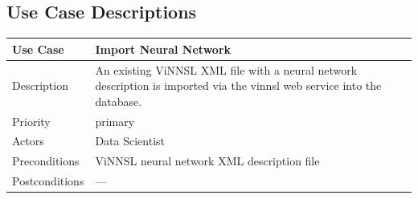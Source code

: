 \subsection{Use Case Descriptions}\label{use-case-descriptions}

\begin{longtable}[]{@{}ll@{}}
\toprule
\begin{minipage}[b]{0.27\columnwidth}\raggedright\strut
\textbf{Use Case}\strut
\end{minipage} & \begin{minipage}[b]{0.68\columnwidth}\raggedright\strut
\textbf{Import Neural Network}\strut
\end{minipage}\tabularnewline
\midrule
\endhead
\begin{minipage}[t]{0.27\columnwidth}\raggedright\strut
Description\strut
\end{minipage} & \begin{minipage}[t]{0.68\columnwidth}\raggedright\strut
An existing ViNNSL XML file with a neural network description is
imported via the vinnsl web service into the database.\strut
\end{minipage}\tabularnewline
\begin{minipage}[t]{0.27\columnwidth}\raggedright\strut
Priority\strut
\end{minipage} & \begin{minipage}[t]{0.68\columnwidth}\raggedright\strut
primary\strut
\end{minipage}\tabularnewline
\begin{minipage}[t]{0.27\columnwidth}\raggedright\strut
Actors\strut
\end{minipage} & \begin{minipage}[t]{0.68\columnwidth}\raggedright\strut
Data Scientist\strut
\end{minipage}\tabularnewline
\begin{minipage}[t]{0.27\columnwidth}\raggedright\strut
Preconditions\strut
\end{minipage} & \begin{minipage}[t]{0.68\columnwidth}\raggedright\strut
ViNNSL neural network XML description file\strut
\end{minipage}\tabularnewline
\begin{minipage}[t]{0.27\columnwidth}\raggedright\strut
Postconditions\strut
\end{minipage} & \begin{minipage}[t]{0.68\columnwidth}\raggedright\strut
---\strut
\end{minipage}\tabularnewline

\end{longtable}
